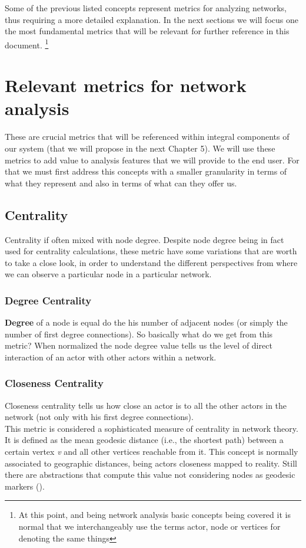Some of the previous listed concepts represent metrics for analyzing networks, thus requiring a more detailed explanation. In the next sections we will focus one the most fundamental metrics that will be relevant for further reference in this document. \footnote{At this point, and being network analysis basic concepts being covered it is normal that we interchangeably use the terms actor, node or vertices for denoting the same things}

\section{Relevant metrics for network analysis}
These are crucial metrics that will be referenced within integral components of our system (that we will propose in the next Chapter 5). We will use these metrics to add value to analysis features that we will provide to the end user. For that we must first address this concepts with a smaller granularity in terms of
what they represent and also in terms of what can they offer us.

\subsection{Centrality}
Centrality if often mixed with node degree. Despite node degree being in fact used for centrality calculations, these metric have some variations
that are worth to take a close look, in order to understand the different perspectives from where we can observe a particular node in a particular network.

\subsubsection*{Degree Centrality}
\textbf{Degree} of a node is equal do the his number of adjacent nodes (or simply the number of first degree connections).
So basically what do we get from this metric? When normalized the node degree value tells us the level of direct interaction of an actor with other
actors within a network.

\subsubsection*{Closeness Centrality}
Closeness centrality tells us how close an actor is to all the other actors in the network (not only with his first degree connections).\\
\indent This metric is considered a sophisticated measure of centrality in network theory. It is defined as the mean geodesic distance
(i.e., the shortest path) between a certain vertex \textit{v} and all other vertices reachable from it. This concept is normally associated to
geographic distances, being actors closeness mapped to reality. Still there are abstractions that compute
this value not considering nodes as geodesic markers (\cite{politaktivsna}).

